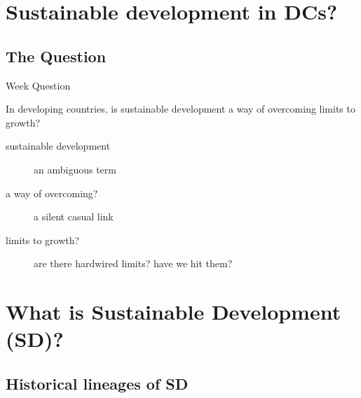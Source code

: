 

\section{Sustainable development in DCs?}


\subsection{The Question}

\begin{frame}{Week Question}{}

In developing countries, is sustainable development a way of overcoming limits to growth?


  \begin{description}
  \item [sustainable development] an ambiguous term
		    
  \item [a way of overcoming?] a silent casual link
      
  \item [limits to growth?] are there hardwired limits? have we hit them?
		    \mycomment{}
		   
 	      
  \end{description}
\end{frame}


\section{What is Sustainable Development (SD)?}

\subsection{Historical lineages of SD}

